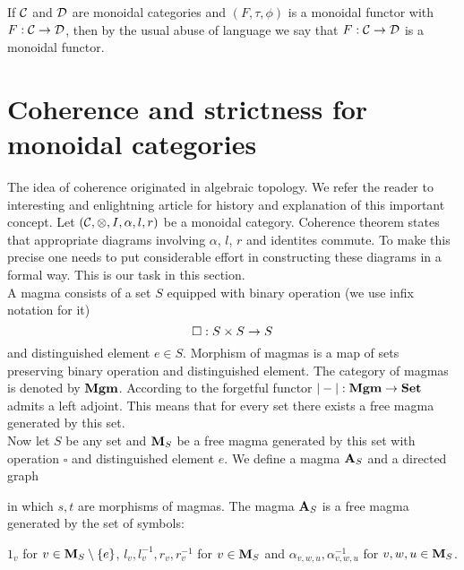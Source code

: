 \noindent
If ${\mathcal C}$ and ${\mathcal D}$ are monoidal categories and $(F,\tau,\phi)$ is a monoidal functor with $F:{\mathcal C}\rightarrow {\mathcal D}$, then by the usual abuse of language we say that $F:{\mathcal C}\rightarrow {\mathcal D}$ is a monoidal functor.

\section{Coherence and strictness for monoidal categories}
\noindent
The idea of coherence originated in algebraic topology. We refer the reader to interesting and enlightning article \cite{maclane1963natural} for history and explanation of this important concept. Let $({\mathcal C},\otimes, I,\alpha, l, r)$ be a monoidal category. Coherence theorem states that appropriate diagrams involving $\alpha$, $l$, $r$ and identites commute. To make this precise one needs to put considerable effort in constructing these diagrams in a formal way. This is our task in this section.\\
A magma consists of a set $S$ equipped with binary operation (we use infix notation for it)
$$\square:S\times S\rightarrow S$$
and distinguished element $e\in S$. Morphism of magmas is a map of sets preserving binary operation and distinguished element. The category of magmas is denoted by $\mathbf{Mgm}$. According to {\cite[Corollary 3.7.8]{borceux1994handbook}} the forgetful functor $|-|:\mathbf{Mgm}\rightarrow \mathbf{Set}$ admits a left adjoint. This means that for every set there exists a free magma generated by this set.\\
Now let $S$ be any set and $\mathbf{M}_S$ be a free magma generated by this set with operation $\square$ and distinguished element $e$. We define a magma $\mathbf{A}_S$ and a directed graph
\begin{center}
\end{center}
in which $s, t$ are morphisms of magmas. The magma $\mathbf{A}_S$ is a free magma generated by the set of symbols:
\begin{center}
$1_v$ for $v\in \mathbf{M}_S\setminus \{e\}$, $l_v,l^{-1}_v,r_v,r^{-1}_v$ for $v\in \mathbf{M}_S$ and $\alpha_{v,w,u},\alpha^{-1}_{v,w,u}$ for $v,w,u\in \mathbf{M}_S$.
\end{center}
